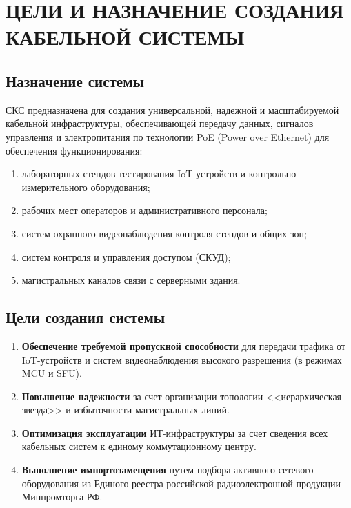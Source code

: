 \documentclass[a4paper,oneside,14pt]{extreport}
\begin{document}

\chapter{ЦЕЛИ И НАЗНАЧЕНИЕ СОЗДАНИЯ КАБЕЛЬНОЙ СИСТЕМЫ}

\section{Назначение системы}
СКС предназначена для создания универсальной, надежной и масштабируемой кабельной инфраструктуры, обеспечивающей передачу данных, сигналов управления и электропитания по технологии PoE (Power over Ethernet) для обеспечения функционирования:
\begin{enumerate}[label=\asbuk*)]
    \item лабораторных стендов тестирования IoT-устройств и контрольно-измерительного оборудования;
    \item рабочих мест операторов и административного персонала;
    \item систем охранного видеонаблюдения контроля стендов и общих зон;
    \item систем контроля и управления доступом (СКУД);
    \item магистральных каналов связи с серверными здания.
\end{enumerate}

\section{Цели создания системы}
\begin{enumerate}[label=\thesection.\arabic*]
    \item \textbf{Обеспечение требуемой пропускной способности} для передачи трафика от IoT-устройств и систем видеонаблюдения высокого разрешения (в режимах MCU и SFU).
    \item \textbf{Повышение надежности} за счет организации топологии <<иерархическая звезда>> и избыточности магистральных линий.
    \item \textbf{Оптимизация эксплуатации} ИТ-инфраструктуры за счет сведения всех кабельных систем к единому коммутационному центру.
    \item \textbf{Выполнение импортозамещения} путем подбора активного сетевого оборудования из Единого реестра российской радиоэлектронной продукции Минпромторга РФ.
\end{enumerate}
\end{document}
